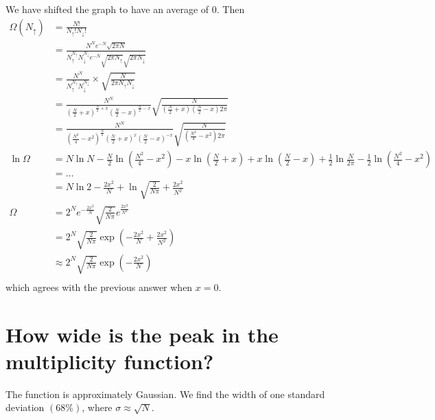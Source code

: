 \documentclass[answers]{exam}
\begin{document}
\begin{questions}
\begin{parts}
	\begin{solution}
		We have shifted the graph to have an average of 0. Then
		\begin{align*}
			\Omega(N_\uparrow) &= \frac{N!}{N_\uparrow ! N_\downarrow !} \\
					   &= \frac{N^Ne^{-N}\sqrt{2\pi N}}{N_\uparrow^{N_\uparrow}N_\downarrow^{N_\downarrow}e^{-N} \sqrt{2\pi N_\uparrow}\sqrt{2\pi N_\downarrow}} \\
					   &= \frac{N^N}{N_\uparrow^{N_\uparrow}N_\downarrow^{N_\downarrow}} \times \sqrt{\frac{N}{2\pi N_\uparrow N_\downarrow}} \\
					   &= \frac{N^N}{\left(\frac{N}{2}+x\right)^{\frac{N}{2}+x}\left(\frac{N}{2}-x\right)^{\frac{N}{2}-x}} \sqrt{\frac{N}{\left(\frac{N}{2}+x\right)\left(\frac{N}{2}-x\right)2\pi}} \\
					   &= \frac{N^N}{\left(\frac{N^2}{4}-x^2\right)^{\frac{N}{2}}\left(\frac{N}{2}+x\right)^x\left(\frac{N}{2}-x\right)^{-x}} \sqrt{\frac{N}{\left(\frac{N^2}{4}-x^2\right)2\pi}} \\
			\ln\Omega &= N\ln N - \frac{N}{2}\ln\left(\frac{N^2}{4}-x^2\right) - x\ln\left(\frac{N}{2}+x\right) + x \ln\left(\frac{N}{2}-x\right) + \frac{1}{2}\ln\frac{N}{2\pi} - \frac{1}{2}\ln\left(\frac{N^2}{4}-x^2\right) \\
				  &= \dots \\
				  &= N\ln 2 - \frac{2x^2}{N} + \ln\sqrt{\frac{2}{N\pi}} + \frac{2x^2}{N^2} \\
			\Omega &= 2^Ne^{-\frac{2x^2}{N}}\sqrt{\frac{2}{N\pi}}e^{\frac{2x^2}{N^2}} \\
			       &= 2^N\sqrt{\frac{2}{N\pi}}\exp\left(-\frac{2x^2}{N}+\frac{2x^2}{N^2}\right) \\
			       &\approx 2^N\sqrt{\frac{2}{N\pi}}\exp\left(-\frac{2x^2}{N}\right) \\
		\end{align*}
		which agrees with the previous answer when $x=0$.
	\end{solution}

	\part{How wide is the peak in the multiplicity function?}

	\begin{solution}
		The function is approximately Gaussian. We find the width of one standard deviation $(68\%)$, where $\sigma \approx \sqrt{N}$.
	\end{solution}


\end{parts}
\end{questions}
\end{document}
